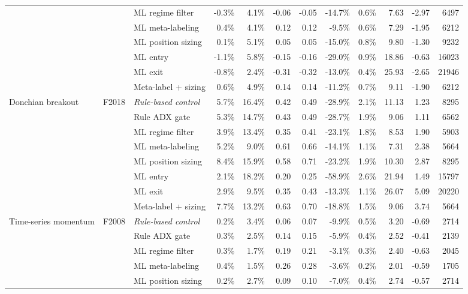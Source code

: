 \begin{longtable}{p{2.2cm} l p{2.6cm} r r r r r r r r r}
 &  & ML regime filter & -0.3\% & 4.1\% & -0.06 & -0.05 & -14.7\% & 0.6\% & 7.63 & -2.97 & 6497 \\
 &  & ML meta-labeling & 0.4\% & 4.1\% & 0.12 & 0.12 & -9.5\% & 0.6\% & 7.29 & -1.95 & 6212 \\
 &  & ML position sizing & 0.1\% & 5.1\% & 0.05 & 0.05 & -15.0\% & 0.8\% & 9.80 & -1.30 & 9232 \\
 &  & ML entry & -1.1\% & 5.8\% & -0.15 & -0.16 & -29.0\% & 0.9\% & 18.86 & -0.63 & 16023 \\
 &  & ML exit & -0.8\% & 2.4\% & -0.31 & -0.32 & -13.0\% & 0.4\% & 25.93 & -2.65 & 21946 \\
 &  & Meta-label + sizing & 0.6\% & 4.9\% & 0.14 & 0.14 & -11.2\% & 0.7\% & 9.11 & -1.90 & 6212 \\
Donchian breakout & F2018 & \textit{Rule-based control} & 5.7\% & 16.4\% & 0.42 & 0.49 & -28.9\% & 2.1\% & 11.13 & 1.23 & 8295 \\
 &  & Rule ADX gate & 5.3\% & 14.7\% & 0.43 & 0.49 & -28.7\% & 1.9\% & 9.06 & 1.11 & 6562 \\
 &  & ML regime filter & 3.9\% & 13.4\% & 0.35 & 0.41 & -23.1\% & 1.8\% & 8.53 & 1.90 & 5903 \\
 &  & ML meta-labeling & 5.2\% & 9.0\% & 0.61 & 0.66 & -14.1\% & 1.1\% & 7.31 & 2.38 & 5664 \\
 &  & ML position sizing & 8.4\% & 15.9\% & 0.58 & 0.71 & -23.2\% & 1.9\% & 10.30 & 2.87 & 8295 \\
 &  & ML entry & 2.1\% & 18.2\% & 0.20 & 0.25 & -58.9\% & 2.6\% & 21.94 & 1.49 & 15797 \\
 &  & ML exit & 2.9\% & 9.5\% & 0.35 & 0.43 & -13.3\% & 1.1\% & 26.07 & 5.09 & 20220 \\
 &  & Meta-label + sizing & 7.7\% & 13.2\% & 0.63 & 0.70 & -18.8\% & 1.5\% & 9.06 & 3.74 & 5664 \\
Time-series momentum & F2008 & \textit{Rule-based control} & 0.2\% & 3.4\% & 0.06 & 0.07 & -9.9\% & 0.5\% & 3.20 & -0.69 & 2714 \\
 &  & Rule ADX gate & 0.3\% & 2.5\% & 0.14 & 0.15 & -5.9\% & 0.4\% & 2.52 & -0.41 & 2139 \\
 &  & ML regime filter & 0.3\% & 1.7\% & 0.19 & 0.21 & -3.1\% & 0.3\% & 2.40 & -0.63 & 2045 \\
 &  & ML meta-labeling & 0.4\% & 1.5\% & 0.26 & 0.28 & -3.6\% & 0.2\% & 2.01 & -0.59 & 1705 \\
 &  & ML position sizing & 0.2\% & 2.7\% & 0.09 & 0.10 & -7.0\% & 0.4\% & 2.74 & -0.57 & 2714 \\

\end{longtable}
